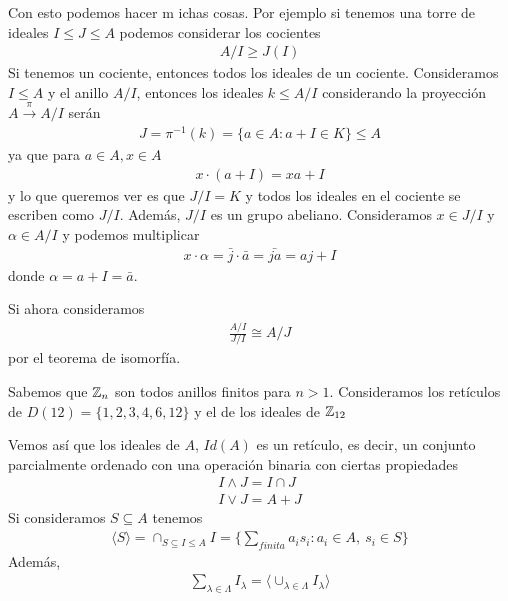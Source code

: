 Con esto podemos hacer m ichas cosas. Por ejemplo si tenemos una torre de ideales $I \leq J \leq A$ podemos considerar los cocientes
\begin{gather*}
    A/I \geq J(I)
\end{gather*}
Si tenemos un cociente, entonces todos los ideales de un cociente. Consideramos $I\leq A$ y el anillo $A/I$, entonces los ideales $k\leq A/I$ considerando la proyección $A \overset{\pi}{\to} A/I$ serán
\begin{gather*}
    J=\pi^{-1}(k) = \{a \in A : a+I \in K\} \leq A
\end{gather*}
ya que para $a\in A, x\in A$
\begin{gather*}
    x \cdot(a+I) = xa + I
\end{gather*}
y lo que queremos ver es que $J/I = K$ y todos los ideales en el cociente se escriben como $J/I$. Además, $J/I$ es un grupo abeliano. Consideramos $x \in J/I$ y $\alpha \in A/I$ y podemos multiplicar
\begin{gather*}
    x\cdot \alpha = \bar{j} \cdot \bar{a} = \bar{ja} = aj + I
\end{gather*}
donde $\alpha = a + I = \bar{a}$. 

Si ahora consideramos 
\begin{gather*}
    \frac{A/I}{J/I} \cong A/J
\end{gather*}
por el teorema de isomorfía.



Sabemos que $\mathbb{Z}_n$ son todos anillos finitos para $n>1$. Consideramos los retículos de $D(12) = \{1,2,3,4,6,12\}$ y el de los ideales de $\mathbb{Z}_{12}$ %

Vemos así que los ideales de $A$, $Id(A)$ es un retículo, es decir, un conjunto parcialmente ordenado con una operación binaria con ciertas propiedades %
\begin{gather*}
    I \wedge J = I \cap J\\
    I \vee J = A + J
\end{gather*}
Si consideramos $S \subseteq A$ tenemos 
\begin{gather*}
    \langle S \rangle = \cap_{S \subseteq I \leq A} I = \{\sum_{finita} a_is_i : a_i\in A,\ s_i\in S\}
\end{gather*}
Además,
\begin{gather*}
    \sum_{\lambda \in \Lambda} I_\lambda = \langle \cup_{\lambda \in \Lambda} I_\lambda \rangle
\end{gather*}

